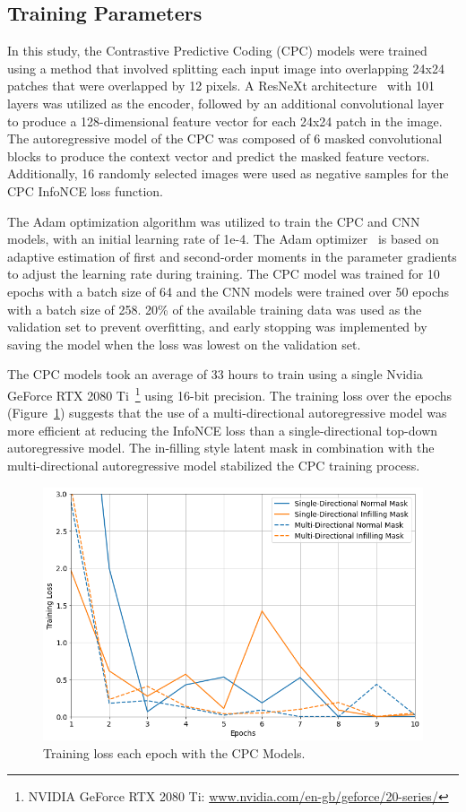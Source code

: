 \subsection{Training Parameters}
\label{subsec:unsupervised_training}
In this study, the Contrastive Predictive Coding (CPC) models were trained using a method that involved splitting each input image into overlapping 24x24 patches that were overlapped by 12 pixels. A ResNeXt architecture~\citep{xie2017aggregated} with 101 layers was utilized as the encoder, followed by an additional convolutional layer to produce a 128-dimensional feature vector for each 24x24 patch in the image. The autoregressive model of the CPC was composed of 6 masked convolutional blocks to produce the context vector and predict the masked feature vectors. Additionally, 16 randomly selected images were used as negative samples for the CPC InfoNCE loss function.

The Adam optimization algorithm was utilized to train the CPC and CNN models, with an initial learning rate of 1e-4. The Adam optimizer~\citep{kingma2014adam} is based on adaptive estimation of first and second-order moments in the parameter gradients to adjust the learning rate during training. The CPC model was trained for 10 epochs with a batch size of 64 and the CNN models were trained over 50 epochs with a batch size of 258. 20\% of the available training data was used as the validation set to prevent overfitting, and early stopping was implemented by saving the model when the loss was lowest on the validation set.

The CPC models took an average of 33 hours to train using a single Nvidia GeForce RTX 2080 Ti~\footnote{NVIDIA GeForce RTX 2080 Ti: \url{www.nvidia.com/en-gb/geforce/20-series/}} using 16-bit precision. The training loss over the epochs (Figure~\ref{fig:cpc_training}) suggests that the use of a multi-directional autoregressive model was more efficient at reducing the InfoNCE loss than a single-directional top-down autoregressive model. The in-filling style latent mask in combination with the multi-directional autoregressive model stabilized the CPC training process.

\begin{figure}[h]
	\centering
	\includegraphics[width=\textwidth]{images/cpc_training.png}
	\caption{Training loss each epoch with the CPC Models.}
	\label{fig:cpc_training}
\end{figure}

